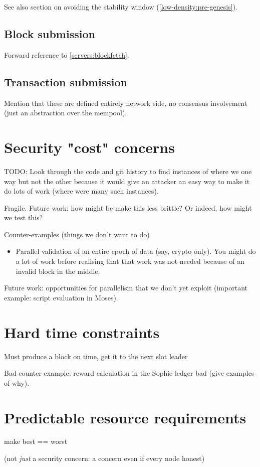 See also section on avoiding the stability window
(\cref{low-density:pre-genesis}).

\subsection{Block submission}
\label{nonfunctional:network:blocksubmission}

Forward reference to \cref{servers:blockfetch}.

\subsection{Transaction submission}
\label{nonfunctional:network:txsubmission}

Mention that these are defined entirely network side, no consensus involvement
(just an abstraction over the mempool).

\section{Security "cost" concerns}

TODO: Look through the code and git history to find instances of where we
one way but not the other because it would give an attacker an easy way to
make it do lots of work (where were many such instances).

Fragile. Future work: how might be make this less brittle?
Or indeed, how might we test this?

Counter-examples (things we don't want to do)

\begin{itemize}
\item Parallel validation of an entire epoch of data (say, crypto only).
You might do a lot of work before realising that that work was not needed because
of an invalid block in the middle.
\end{itemize}

Future work: opportunities for parallelism that we don't yet exploit
(important example: script evaluation in Moses).

\section{Hard time constraints}

Must produce a block on time, get it to the next slot leader

Bad counter-example: reward calculation in the Sophie ledger bad
(give examples of why).

\section{Predictable resource requirements}
\label{nonfunctional:best-is-worst}

make best == worst

(not \emph{just} a security concern: a concern even if every node honest)
